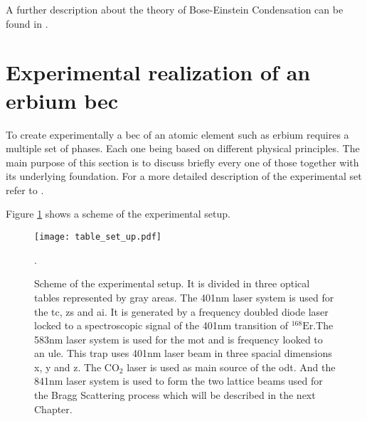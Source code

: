 A further description about the theory of Bose-Einstein Condensation can be found in \cite{Masahito2010, Pethick2008}.

\section{Experimental realization of an erbium \ac{bec}} \label{sec:experimental_preparation}

To create experimentally a \ac{bec} of an atomic element such as erbium requires a multiple set of phases. Each one being based on different physical principles. The main purpose of this section is to discuss briefly every one of those together with its underlying foundation. For a more detailed description of the experimental set refer to  \cite{Ulitzsch2016}. 

Figure \ref{fig:table_set_up} shows a scheme of the experimental setup. 



\begin{figure}[!htbp]\centering
	\texttt{[image: table\_set\_up.pdf]}
	\caption[Scheme of the experimental setup]{Scheme of the experimental setup. It is divided in three optical tables represented by gray areas. The 401nm laser system is used for the \acf{tc}, \acf{zs} and \acf{ai}. It is generated by a frequency doubled diode laser locked to a spectroscopic signal of the 401nm transition of $^{\text{168}}\text{Er}$.The 583nm laser system is used for the \acf{mot} and is frequency looked to an \acf{ule}. This trap uses 401nm laser beam in three spacial dimensions x, y and z. The $\text{CO}_{2}$ laser is used as main source of the \acf{odt}. And the 841nm laser system is used to form the two lattice beams used for the Bragg Scattering process which will be described in the next Chapter.}\label{fig:table_set_up}. 
\end{figure}

